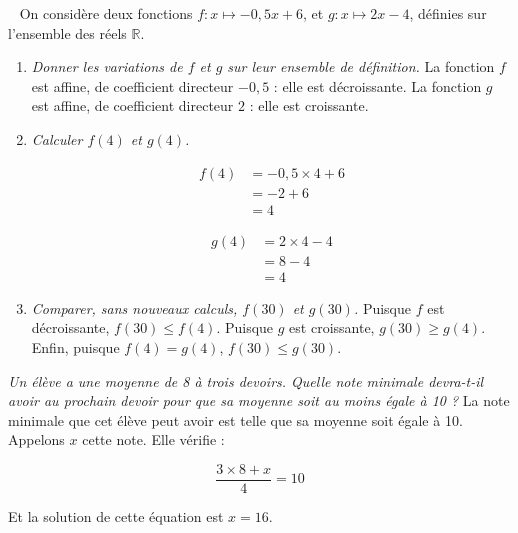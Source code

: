 \documentclass[12pt]{article}
\begin{document}
\begin{exercice}~
  On considère deux fonctions $f:x\mapsto -0,5x+6$, et $g:x\mapsto 2x-4$,
  définies sur l'ensemble des réels $\mathbb{R}$.
  \begin{enumerate}
    \item \emph{Donner les variations de $f$ et $g$ sur leur ensemble de définition.} La fonction $f$ est affine, de coefficient directeur $-0,5$ : elle est décroissante. La fonction $g$ est affine, de coefficient directeur $2$ : elle est croissante.
    \item \emph{Calculer $f(4)$ et $g(4)$.}
      \begin{multicols}{2}
      \begin{align*}
        f(4) &= -0,5\times 4+6 \\
             &= -2 + 6 \\
             &= 4
      \end{align*}

      \begin{align*}
        g(4) &= 2\times 4-4 \\
             &= 8 -4 \\
             &= 4
      \end{align*}
    \end{multicols}
    \item \emph{Comparer, sans nouveaux calculs, $f(30)$ et $g(30)$.} Puisque $f$ est décroissante, $f(30)\leq f(4)$. Puisque $g$ est croissante, $g(30)\geq g(4)$. Enfin, puisque $f(4)=g(4)$, $f(30)\leq g(30)$.
  \end{enumerate}
\end{exercice}


\begin{exercice}[Moyenne]
  \emph{Un élève a une moyenne de 8 à trois devoirs. Quelle note minimale devra-t-il avoir au prochain devoir pour que sa moyenne soit au moins égale à 10 ?} La note minimale que cet élève peut avoir est telle que sa moyenne soit égale à 10. Appelons $x$ cette note. Elle vérifie :

  \[\frac{3\times8+x}{4}=10\]

  Et la solution de cette équation est $x=16$.
\end{exercice}
\end{document}
